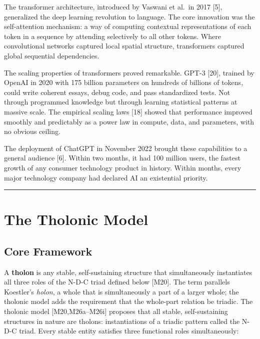 \documentclass[12pt]{article}
\begin{document}
The transformer architecture, introduced by Vaswani et al.~in 2017
{[}5{]}, generalized the deep learning revolution to language. The core
innovation was the self-attention mechanism: a way of computing
contextual representations of each token in a sequence by attending
selectively to all other tokens. Where convolutional networks captured
local spatial structure, transformers captured global sequential
dependencies.

The scaling properties of transformers proved remarkable. GPT-3
{[}20{]}, trained by OpenAI in 2020 with 175 billion parameters on
hundreds of billions of tokens, could write coherent essays, debug code,
and pass standardized tests. Not through programmed knowledge but
through learning statistical patterns at massive scale. The empirical
scaling laws {[}18{]} showed that performance improved smoothly and
predictably as a power law in compute, data, and parameters, with no
obvious ceiling.

The deployment of ChatGPT in November 2022 brought these capabilities to
a general audience {[}6{]}. Within two months, it had 100 million users,
the fastest growth of any consumer technology product in history. Within
months, every major technology company had declared AI an existential
priority.

\begin{center}\rule{0.5\linewidth}{0.5pt}\end{center}

\section{The Tholonic Model}\label{the-tholonic-model}

\subsection{Core Framework}\label{core-framework}

A \textbf{tholon} is any stable, self-sustaining structure that
simultaneously instantiates all three roles of the N-D-C triad defined
below {[}M20{]}. The term parallels Koestler's \emph{holon}, a whole
that is simultaneously a part of a larger whole; the tholonic model adds
the requirement that the whole-part relation be triadic. The tholonic
model {[}M20,M26a--M26i{]} proposes that all stable, self-sustaining
structures in nature are tholons: instantiations of a triadic pattern
called the N-D-C triad. Every stable entity satisfies three functional
roles simultaneously:
\end{document}
